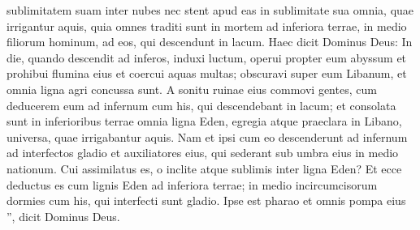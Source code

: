 \begin{biblechapter}
\begin{biblechapter}
\begin{biblechapter}
\begin{biblechapter}
\begin{biblechapter}
\begin{biblechapter}
\begin{biblechapter}
\begin{biblechapter}
\begin{biblechapter}
\begin{biblechapter}
\begin{biblechapter}
\begin{biblechapter}
\begin{biblechapter}
\begin{biblechapter}
\begin{biblechapter}
\begin{biblechapter}
\begin{biblechapter}
\begin{biblechapter}
\begin{biblechapter}
\begin{biblechapter}
\begin{biblechapter}
\begin{biblechapter}
\begin{biblechapter}
\begin{biblechapter}
\begin{biblechapter}
\begin{biblechapter}
\begin{biblechapter}
\begin{biblechapter}
\begin{biblechapter}
\begin{biblechapter}
\begin{biblechapter}
 sublimitatem suam inter nubes nec
 stent apud eas in sublimitate sua
 omnia, quae irrigantur aquis, quia
 omnes traditi sunt in mortem
 ad inferiora terrae,
 in medio filiorum hominum,
 ad eos, qui descendunt in lacum.
 \verse Haec dicit Dominus Deus: In die, quando descendit ad inferos, induxi luctum, operui propter eum abyssum et prohibui flumina eius et coercui aquas multas; obscuravi super eum Libanum, et omnia ligna agri concussa sunt. 
\verse A sonitu ruinae eius commovi gentes, cum deducerem eum ad infernum cum his, qui descendebant in lacum; et consolata sunt in inferioribus terrae omnia ligna Eden, egregia atque praeclara in Libano, universa, quae irrigabantur aquis. 
 \verse Nam et ipsi cum eo descenderunt ad infernum ad interfectos gladio et auxiliatores eius, qui sederant sub umbra eius in medio nationum.
 \verse Cui assimilatus es, o inclite atque sublimis inter ligna Eden? Et ecce deductus es cum lignis Eden ad inferiora terrae; in medio incircumcisorum dormies cum his, qui interfecti sunt gladio. Ipse est pharao et omnis pompa eius ”, dicit Dominus Deus.
 

\end{biblechapter}
\end{biblechapter}
\end{biblechapter}
\end{biblechapter}
\end{biblechapter}
\end{biblechapter}
\end{biblechapter}
\end{biblechapter}
\end{biblechapter}
\end{biblechapter}
\end{biblechapter}
\end{biblechapter}
\end{biblechapter}
\end{biblechapter}
\end{biblechapter}
\end{biblechapter}
\end{biblechapter}
\end{biblechapter}
\end{biblechapter}
\end{biblechapter}
\end{biblechapter}
\end{biblechapter}
\end{biblechapter}
\end{biblechapter}
\end{biblechapter}
\end{biblechapter}
\end{biblechapter}
\end{biblechapter}
\end{biblechapter}
\end{biblechapter}
\end{biblechapter}
